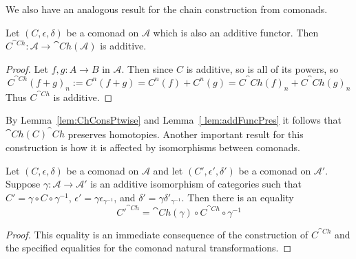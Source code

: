We also have an analogous result for the chain construction from comonads.

\begin{lem}[label=lem:ChConsPres]
    Let $(C,\epsilon,\delta)$ be a comonad on $\mathcal{A}$ which is also an additive functor. Then $C^{\cat{Ch}}:\mathcal{A}\to \cat{Ch}(\mathcal{A})$ is additive.
\end{lem}
\begin{proof}
    Let $f,g:A\to B$ in $\mathcal{A}$. Then since $C$ is additive, so is all of its powers, so \[C^{\cat{Ch}}(f+g)_n := C^n(f+g)=C^n(f)+C^n(g) = C^\cat{Ch}(f)_n+C^\cat{Ch}(g)_n\]
    Thus $C^{\cat{Ch}}$ is additive.
\end{proof}

By Lemma~\ref{lem:ChConsPtwise} and Lemma~\ref{ lem:addFuncPres} it follows that $\cat{Ch}(C)^\cat{Ch}$ preserves homotopies. Another important result for this construction is how it is affected by isomorphisms between comonads.

\begin{lem}[label=lem:ChComIso]
    Let $(C,\epsilon,\delta)$ be a comonad on $\mathcal{A}$ and let $(C',\epsilon',\delta')$ be a comonad on $\mathcal{A}'$. Suppose $\gamma:\mathcal{A}\to \mathcal{A}'$ is an additive isomorphism of categories such that $C' = \gamma\circ C\circ \gamma^{-1}$, $\epsilon' = \gamma\epsilon_{\gamma^{-1}}$, and $\delta' = \gamma\delta'_{\gamma^{-1}}$. Then there is an equality
    \begin{equation*}
        {C'}^{\cat{Ch}} = \cat{Ch}(\gamma)\circ C^{\cat{Ch}}\circ \gamma^{-1}
    \end{equation*}
\end{lem}
\begin{proof}
    This equality is an immediate consequence of the construction of $C^{\cat{Ch}}$ and the specified equalities for the comonad natural transformations.
\end{proof}